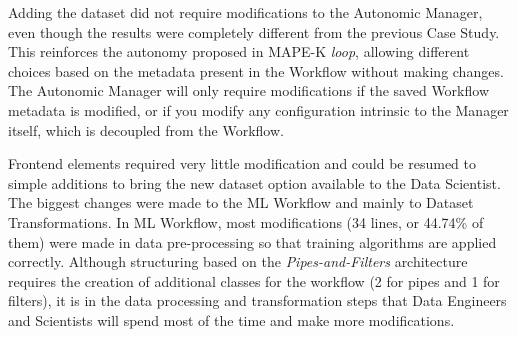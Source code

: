 \documentclass[runningheads]{llncs}
\begin{document}
\begin{table}[H]
\begin{center}
  \caption{Number of modifications performed when adding a new dataset to Workflow}
\label{tbl:ManutencaoPipelineDataset}
\end{center}
\end{table}

Adding the dataset did not require modifications to the Autonomic Manager, even though the results were completely different from the previous Case Study. This reinforces the autonomy proposed in MAPE-K \textit{loop}, allowing different choices based on the metadata present in the Workflow without making changes. The Autonomic Manager will only require modifications if the saved Workflow metadata is modified, or if you modify any configuration intrinsic to the Manager itself, which is decoupled from the Workflow.

Frontend elements required very little modification and could be resumed to simple additions to bring the new dataset option available to the Data Scientist. The biggest changes were made to the ML Workflow and mainly to Dataset Transformations. In ML Workflow, most modifications (34 lines, or 44.74\% of them) were made in data pre-processing so that training algorithms are applied correctly. Although structuring based on the \textit{Pipes-and-Filters} architecture requires the creation of additional classes for the workflow (2 for pipes and 1 for filters), it is in the data processing and transformation steps that Data Engineers and Scientists will spend most of the time and make more modifications.
\end{document}

